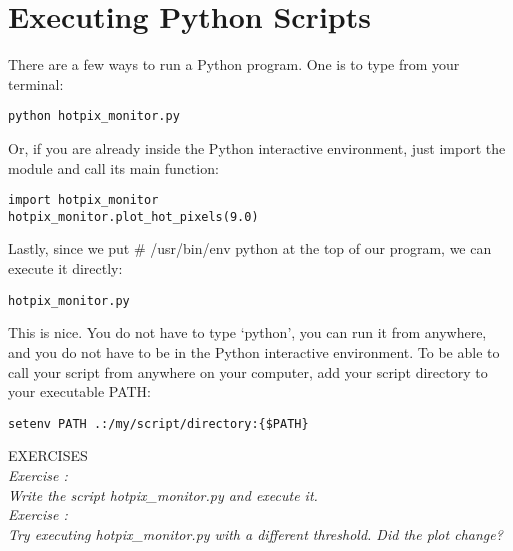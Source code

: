\section{Executing Python Scripts}

There are a few ways to run a Python program.  One is to type from your terminal:

\texttt{\termtab python hotpix\_monitor.py}

Or, if you are already inside the Python interactive environment, just
import the module and call its main function:

\texttt{\pytab import hotpix\_monitor} \\
\texttt{\pytab hotpix\_monitor.plot\_hot\_pixels(9.0)}

Lastly, since we put {\sf\small \#\! /usr/bin/env python} at the top of our program, we can
execute it directly:

\texttt{\termtab hotpix\_monitor.py}

This is nice.  You do not have to type `python', you can run it from
anywhere, and you do not have to be in the Python interactive
environment.  To be able to call your script from anywhere on your computer, add
your script directory to your executable PATH:

\texttt{setenv PATH .:/my/script/directory:\{\$PATH\}}

{\color{blue} {\sf\small EXERCISES}} \\
{\it Exercise  :  \\
  Write the script {\sf\small hotpix\_monitor.py} and execute it.
} \\
{\it Exercise  :  \\
  Try executing {\sf\small hotpix\_monitor.py} with a different threshold.  Did the plot
  change?
}

